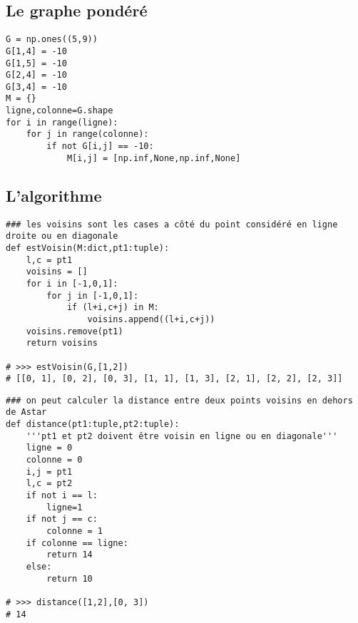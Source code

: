 \subsection{Le graphe pondéré}
\begin{lstlisting}
G = np.ones((5,9))
G[1,4] = -10
G[1,5] = -10
G[2,4] = -10
G[3,4] = -10
M = {}
ligne,colonne=G.shape
for i in range(ligne):
    for j in range(colonne):
        if not G[i,j] == -10:
            M[i,j] = [np.inf,None,np.inf,None]
\end{lstlisting}

\subsection{L'algorithme}
\begin{lstlisting}
### les voisins sont les cases a côté du point considéré en ligne droite ou en diagonale
def estVoisin(M:dict,pt1:tuple):
    l,c = pt1
    voisins = []
    for i in [-1,0,1]:
        for j in [-1,0,1]:
            if (l+i,c+j) in M:
                voisins.append((l+i,c+j))
    voisins.remove(pt1)
    return voisins

# >>> estVoisin(G,[1,2])
# [[0, 1], [0, 2], [0, 3], [1, 1], [1, 3], [2, 1], [2, 2], [2, 3]]
\end{lstlisting}

\begin{lstlisting}
### on peut calculer la distance entre deux points voisins en dehors de Astar
def distance(pt1:tuple,pt2:tuple):
    '''pt1 et pt2 doivent être voisin en ligne ou en diagonale'''
    ligne = 0
    colonne = 0
    i,j = pt1
    l,c = pt2
    if not i == l:
        ligne=1
    if not j == c:
        colonne = 1
    if colonne == ligne:
        return 14
    else:
        return 10

# >>> distance([1,2],[0, 3])
# 14
\end{lstlisting}

